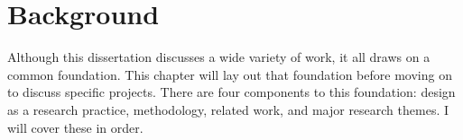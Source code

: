 \chapter{Background}
\label{ch:background}

Although this dissertation discusses a wide variety of work, it all draws on a common foundation. This chapter will lay out that foundation before moving on to discuss specific projects. There are four components to this foundation: design as a research practice, methodology, related work, and major research themes. I will cover these in order.








